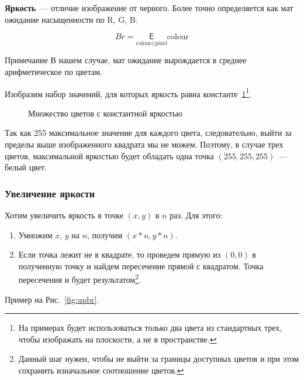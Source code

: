 \textbf{Яркость}~--- отличие изображение от черного. Более точно определяется как мат ожидание насыщенности по R, G, B.

$$Br = {\underset{\text{colour} \in \text{pixel}}{\mathsf{E}} \text{colour}}$$

\begin{callout}{Примечание}
    В нашем случае, мат ожидание вырождается в среднее арифметическое по цветам.
\end{callout}

Изобразим набор значений, для которых яркость равна константе~\ref{fig:constbr}\footnote{На примерах будет использоваться только два цвета из стандартных трех, чтобы изображать на плоскости, а не в пространстве.}.

\begin{figure}[h!]
    \centering
    \caption{Множество цветов с константной яркостью}
    \label{fig:constbr}
\end{figure}

Так как 255 максимальное значение для каждого цвета, следовательно, выйти за пределы выше изображенного квадрата мы не можем. Поэтому, в случае трех цветов, максимальной яркостью будет обладать одна точка $(255, 255, 255)$~--- белый цвет.

\subsubsection{Увеличение яркости}

Хотим увеличить яркость в точке $(x, y)$ в $n$ раз.
Для этого:
\begin{enumerate}
    \item Умножим $x$, $y$ на $n$, получим $(x*n, y*n)$.
    \item Если точка лежит не в квадрате, то проведем прямую из $(0, 0)$ в полученную точку и найдем пересечение прямой с квадратом. Точка пересечения и будет результатом\footnote{Данный шаг нужен, чтобы не выйти за границы доступных цветов и при этом сохранить изначальное соотношение цветов.}.
\end{enumerate}
Пример на Рис.~\ref{fig:upbr}.

